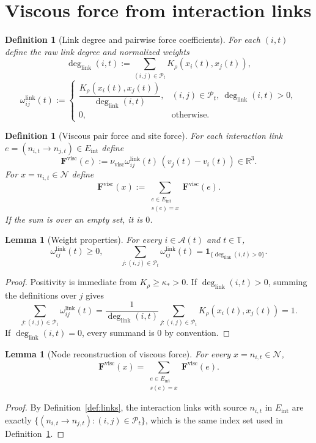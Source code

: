 \documentclass[11pt]{article}
\newtheorem{definition}[theorem]{Definition}
\newtheorem{lemma}[theorem]{Lemma}
\theoremstyle{remark}
\newcommand{\R}{\mathbb R}
\newcommand{\Tset}{\mathbb T}
\newcommand{\mcN}{\mathcal N}
\begin{document}
\section{Viscous force from interaction links}
\label{sec:forces}

\begin{definition}[Link degree and pairwise force coefficients]
\label{def:ig-weights}
For each $(i,t)$ define the raw link degree and normalized weights
\[
\deg_{\mathrm{link}}(i,t):=\sum_{(i,j)\in\mathcal P_t}K_\rho(x_i(t),x_j(t)),
\]
\[
\omega^{\mathrm{link}}_{ij}(t):=
\begin{cases}
\dfrac{K_\rho(x_i(t),x_j(t))}{\deg_{\mathrm{link}}(i,t)},&(i,j)\in\mathcal P_t,\ \deg_{\mathrm{link}}(i,t)>0,\\[0.3em]
0,&\text{otherwise.}
\end{cases}
\]
\end{definition}

\begin{definition}[Viscous pair force and site force]
\label{def:forces}
For each interaction link $e=(n_{i,t}\to n_{j,t})\in E_{\mathrm{int}}$ define
\[
\mathbf F^{\mathrm{visc}}(e):=\nu_{\mathrm{visc}}\omega^{\mathrm{link}}_{ij}(t)\,(v_j(t)-v_i(t))\in\R^3.
\]
For $x=n_{i,t}\in\mcN$ define
\[
\mathbf F^{\mathrm{visc}}(x):=\sum_{\substack{e\in E_{\mathrm{int}}\\ s(e)=x}}\mathbf F^{\mathrm{visc}}(e).
\]
If the sum is over an empty set, it is $0$.
\end{definition}

\begin{lemma}[Weight properties]
\label{lem:weights}
For every $i\in\mathcal A(t)$ and $t\in\Tset$,
\[
\omega^{\mathrm{link}}_{ij}(t)\ge0,\qquad
\sum_{j:(i,j)\in\mathcal P_t}\omega^{\mathrm{link}}_{ij}(t)=\mathbf 1_{\{\deg_{\mathrm{link}}(i,t)>0\}}.
\]
\end{lemma}
\begin{proof}
Positivity is immediate from $K_\rho\ge\kappa_*>0$.
If $\deg_{\mathrm{link}}(i,t)>0$, summing the definitions over $j$ gives
\[
\sum_{j:(i,j)\in\mathcal P_t}\omega^{\mathrm{link}}_{ij}(t)
=\frac{1}{\deg_{\mathrm{link}}(i,t)}\sum_{j:(i,j)\in\mathcal P_t}K_\rho(x_i(t),x_j(t))=1.
\]
If $\deg_{\mathrm{link}}(i,t)=0$, every summand is $0$ by convention.
\end{proof}

\begin{lemma}[Node reconstruction of viscous force]
\label{lem:reconstruction}
For every $x=n_{i,t}\in\mcN$,
\[
\mathbf F^{\mathrm{visc}}(x)=\sum_{\substack{e\in E_{\mathrm{int}}\\ s(e)=x}}\mathbf F^{\mathrm{visc}}(e).
\]
\end{lemma}
\begin{proof}
By Definition~\ref{def:links}, the interaction links with source $n_{i,t}$ in
$E_{\mathrm{int}}$
are exactly $\{(n_{i,t}\to n_{j,t}):(i,j)\in\mathcal P_t\}$, which is the same
index set used in Definition~\ref{def:forces}.
\end{proof}
\end{document}
